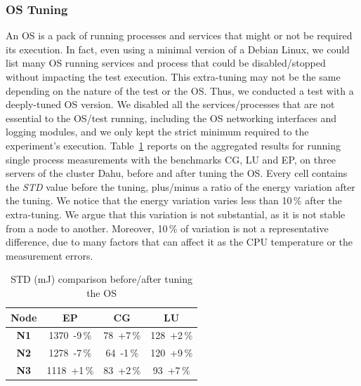 \subsubsection{OS Tuning}
An OS is a pack of running processes and services that might or not be required its execution.
In fact, even using a minimal version of a Debian Linux, we could list many OS running services and process that could be disabled/stopped without impacting the test execution.
This extra-tuning may not be the same depending on the nature of the test or the OS.
Thus, we conducted a test with a deeply-tuned OS version.
We disabled all the services/processes that are not essential to the OS/test running, including the OS networking interfaces and logging modules, and we only kept the strict minimum required to the experiment's execution.
Table~\ref{table:osmin} reports on the aggregated results for running single process measurements with the benchmarks \textsf{CG}, \textsf{LU} and \textsf{EP}, on three servers of the cluster \textsf{Dahu}, before and after tuning the OS.
Every cell contains the \emph{STD} value before the tuning, plus/minus a ratio of the energy variation after the tuning.
We notice that the energy variation varies less than 10\,\% after the extra-tuning.
We argue that this variation is not substantial, as it is not stable from a node to another.
Moreover, 10\,\% of variation is not a representative difference, due to many factors that can affect it as the CPU temperature or the measurement errors.

\begin{table}
    \centering
    \caption{STD (mJ) comparison before/after tuning the OS}
    \label{table:osmin}
    \small
    \begin{tabular}{|c|c|c|c|}
        \hline
        \textbf{Node} & \textbf{\sf EP} & \textbf{\sf CG} & \textbf{\sf LU} \\
        \hline
        \hline
        \textbf{N1}   & 1370~-9\,\%     & 78~+7\,\%       & 128~+2\,\%      \\
        \hline
        \textbf{N2}   & 1278~-7\,\%     & 64~-1\,\%       & 120~+9\,\%      \\
        \hline
        \textbf{N3}   & 1118~+1\,\%     & 83~+2\,\%       & 93~+7\,\%       \\
        \hline
    \end{tabular}
\end{table}

